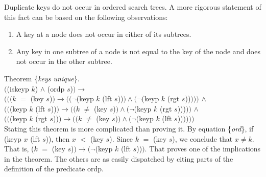 Duplicate keys do not occur in ordered search trees.
A more rigorous statement of this fact can be based on
the following observations:
\begin{enumerate}
\item A key at a node does not occur in either of its subtrees.
\item Any key in one subtree of a node is not equal to the key of the node
      and does not occur in the other subtree.
\end{enumerate}
\label{thm:keys-unique}
Theorem \{\emph{keys unique}\}. \\
$($\textsf{(iskeyp $k$)} $\wedge$ \textsf{(ordp $s$)}$) \rightarrow$ \\
$(((k$ $=$ \textsf{(key $s$)}$) \rightarrow ((\neg$\textsf{(keyp $k$ (lft $s$))}$) \wedge (\neg$\textsf{(keyp $k$ (rgt $s$))}$)))$ $\wedge$ \\
\hspace*{1.5mm}$(($\textsf{(keyp $k$ (lft $s$))}$) \rightarrow ((k$ $\ne$ \textsf{(key $s$)}$) \wedge (\neg$\textsf{(keyp $k$ (rgt $s$)}))$))$ $\wedge$ \\
\hspace*{1.5mm}$(($\textsf{(keyp $k$ (rgt $s$))}$) \rightarrow ((k$ $\ne$ \textsf{(key $s$)}$) \wedge (\neg$(\textsf{keyp $k$ (lft $s$))}$))))$ \\

Stating this theorem is more complicated than proving it.
By equation \{\emph{ord}\}, if \textsf{(keyp $x$ (lft $s$))}, then $x$ $<$ \textsf{(key $s$)}.
Since $k$ $=$ \textsf{(key $s$)}, we conclude that $x \neq k$.
That is, ($k$ $=$ \textsf{(key $s$)}$) \rightarrow (\neg$\textsf{(keyp $k$ (lft $s$))}$)$.
That proves one of the implications in the theorem.
The others are as easily dispatched by citing parts
of the definition of the predicate \textsf{ordp}.

\begin{exercises}

\end{exercises}

